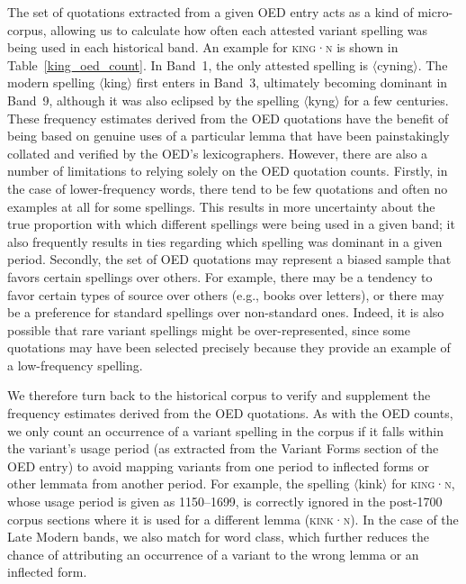 \documentclass[doc,biblatex]{apa7}
\newcommand\lemma[2]{\textsc{#1·#2}}
\newcommand\spelling[1]{\allowbreak$\langle$#1$\rangle$}
\begin{document}
The set of quotations extracted from a given OED entry acts as a kind of micro-corpus, allowing us to calculate how often each attested variant spelling was being used in each historical band. An example for \lemma{king}{n} is shown in Table~\ref{king_oed_count}. In Band~1, the only attested spelling is \spelling{cyning}. The modern spelling \spelling{king} first enters in Band~3, ultimately becoming dominant in Band~9, although it was also eclipsed by the spelling \spelling{kyng} for a few centuries. These frequency estimates derived from the OED quotations have the benefit of being based on genuine uses of a particular lemma that have been painstakingly collated and verified by the OED's lexicographers. However, there are also a number of limitations to relying solely on the OED quotation counts. Firstly, in the case of lower-frequency words, there tend to be few quotations and often no examples at all for some spellings. This results in more uncertainty about the true proportion with which different spellings were being used in a given band; it also frequently results in ties regarding which spelling was dominant in a given period. Secondly, the set of OED quotations may represent a biased sample that favors certain spellings over others. For example, there may be a tendency to favor certain types of source over others (e.g., books over letters), or there may be a preference for standard spellings over non-standard ones. Indeed, it is also possible that rare variant spellings might be over-represented, since some quotations may have been selected precisely because they provide an example of a low-frequency spelling.

We therefore turn back to the historical corpus to verify and supplement the frequency estimates derived from the OED quotations. As with the OED counts, we only count an occurrence of a variant spelling in the corpus if it falls within the variant's usage period (as extracted from the Variant Forms section of the OED entry) to avoid mapping variants from one period to inflected forms or other lemmata from another period. For example, the spelling \spelling{kink} for \lemma{king}{n}, whose usage period is given as 1150--1699, is correctly ignored in the post-1700 corpus sections where it is used for a different lemma (\lemma{kink}{n}). In the case of the Late Modern bands, we also match for word class, which further reduces the chance of attributing an occurrence of a variant to the wrong lemma or an inflected form.
\end{document}

